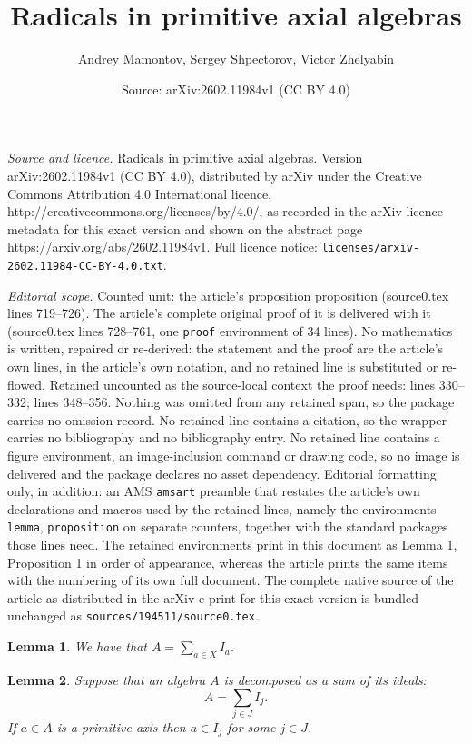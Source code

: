 \documentclass[10pt,a4paper]{amsart}
\title{Radicals in primitive axial algebras}
\author{Andrey Mamontov, Sergey Shpectorov, Victor Zhelyabin}
\date{Source: arXiv:2602.11984v1 (CC BY 4.0)}
\newtheorem{lemma}{Lemma}
\begin{document}
\maketitle

\noindent\emph{Source and licence.} Radicals in primitive axial algebras. Version arXiv:2602.11984v1 (CC BY 4.0), distributed by arXiv under the Creative Commons Attribution 4.0 International licence, http://creativecommons.org/licenses/by/4.0/, as recorded in the arXiv licence metadata for this exact version and shown on the abstract page https://arxiv.org/abs/2602.11984v1. Full licence notice: \texttt{licenses/arxiv-2602.11984-CC-BY-4.0.txt}.\par\smallskip

\noindent\textit{Editorial scope.} Counted unit: the article's proposition proposition (source0.tex lines 719--726). The article's complete original proof of it is delivered with it (source0.tex lines 728--761, one \texttt{proof} environment of 34 lines). No mathematics is written, repaired or re-derived: the statement and the proof are the article's own lines, in the article's own notation, and no retained line is substituted or re-flowed.  Retained uncounted as the source-local context the proof needs: lines 330--332; lines 348--356.  Nothing was omitted from any retained span, so the package carries no omission record.  No retained line contains a citation, so the wrapper carries no bibliography and no bibliography entry.  No retained line contains a figure environment, an image-inclusion command or drawing code, so no image is delivered and the package declares no asset dependency.  Editorial formatting only, in addition: an AMS \texttt{amsart} preamble that restates the article's own declarations and macros used by the retained lines, namely the environments \texttt{lemma}, \texttt{proposition} on separate counters, together with the standard packages those lines need.  The retained environments print in this document as Lemma 1, Proposition 1 in order of appearance, whereas the article prints the same items with the numbering of its own full document.  The complete native source of the article as distributed in the arXiv e-print for this exact version is bundled unchanged as \texttt{sources/194511/source0.tex}.
\begin{lemma} \label{block decomposition}
We have that $A=\sum_{a\in X}I_a$.
\end{lemma}

\begin{lemma} \label{sum}
Suppose that an algebra $A$ is decomposed as a sum of its ideals:
%
$$
A=\sum_{j\in J}I_j.
$$
%
If $a\in A$ is a primitive axis then $a\in I_j$ for some $j\in J$.
\end{lemma}
\end{document}
